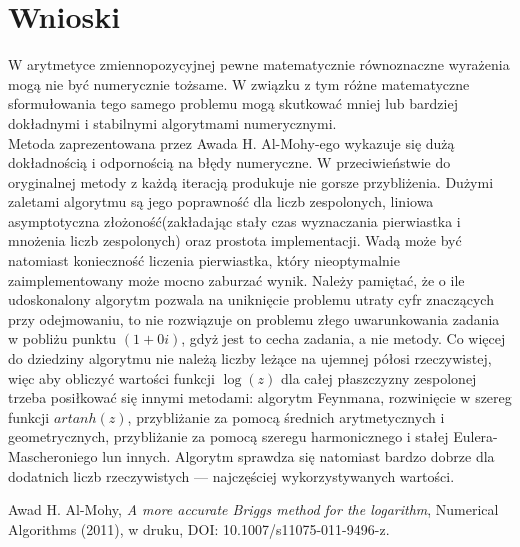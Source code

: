 \documentclass{article}
\begin{document}
\section{Wnioski}
	W arytmetyce zmiennopozycyjnej pewne matematycznie równoznaczne wyrażenia mogą nie być numerycznie tożsame. W związku z tym różne matematyczne sformułowania tego samego problemu mogą skutkować mniej lub bardziej dokładnymi i stabilnymi algorytmami numerycznymi. \\
\indent
	Metoda zaprezentowana przez Awada H. Al-Mohy-ego wykazuje się dużą dokładnością i odpornością na błędy numeryczne. W przeciwieństwie do oryginalnej metody z każdą iteracją produkuje nie gorsze przybliżenia. Dużymi zaletami algorytmu są jego poprawność dla liczb zespolonych, liniowa asymptotyczna złożoność(zakładając stały czas wyznaczania pierwiastka i mnożenia liczb zespolonych) oraz prostota implementacji. Wadą może być natomiast konieczność liczenia pierwiastka, który nieoptymalnie zaimplementowany może mocno zaburzać wynik. Należy pamiętać, że o ile udoskonalony algorytm pozwala na uniknięcie problemu utraty cyfr znaczących przy odejmowaniu, to nie rozwiązuje on problemu złego uwarunkowania zadania w pobliżu punktu $(1+0i)$, gdyż jest to cecha zadania, a nie metody. Co więcej do dziedziny algorytmu nie należą liczby leżące na ujemnej półosi rzeczywistej, więc aby obliczyć wartości funkcji $\log(z)$ dla całej płaszczyzny zespolonej trzeba posiłkować się innymi metodami: algorytm Feynmana, rozwinięcie w szereg funkcji $artanh (z)$, przybliżanie za pomocą średnich arytmetycznych i geometrycznych, przybliżanie za pomocą szeregu harmonicznego i stałej Eulera-Mascheroniego lun innych. Algorytm sprawdza się natomiast bardzo dobrze dla dodatnich liczb rzeczywistych --- najczęściej wykorzystywanych wartości.
	
\begin{thebibliography}{9}
    
 Awad H. Al-Mohy,
\emph{A more accurate Briggs method for the logarithm},
Numerical Algorithms (2011), w druku,
DOI: 10.1007/s11075-011-9496-z.
    
\end{thebibliography}
\end{document}
